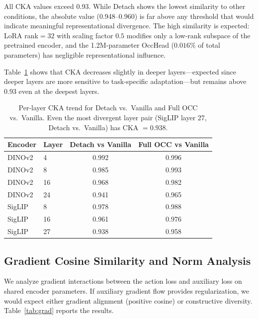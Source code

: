 \documentclass[10pt,letterpaper]{article}
\begin{document}
All CKA values exceed 0.93. While Detach shows the lowest similarity to other conditions, the absolute value (0.948--0.960) is far above any threshold that would indicate meaningful representational divergence. The high similarity is expected: LoRA rank$=32$ with scaling factor $0.5$ modifies only a low-rank subspace of the pretrained encoder, and the 1.2M-parameter OccHead ($0.016\%$ of total parameters) has negligible representational influence.

Table~\ref{tab:cka_layer} shows that CKA decreases slightly in deeper layers---expected since deeper layers are more sensitive to task-specific adaptation---but remains above 0.93 even at the deepest layers.

\begin{table}[h]
\centering
\caption{Per-layer CKA trend for Detach vs.\ Vanilla and Full OCC vs.\ Vanilla. Even the most divergent layer pair (SigLIP layer 27, Detach vs.\ Vanilla) has CKA $= 0.938$.}
\label{tab:cka_layer}
\begin{tabular}{llcc}
\toprule
\textbf{Encoder} & \textbf{Layer} & \textbf{Detach vs Vanilla} & \textbf{Full OCC vs Vanilla} \\
\midrule
DINOv2 & 4  & 0.992 & 0.996 \\
DINOv2 & 8  & 0.985 & 0.993 \\
DINOv2 & 16 & 0.968 & 0.982 \\
DINOv2 & 24 & 0.941 & 0.965 \\
SigLIP & 8  & 0.978 & 0.988 \\
SigLIP & 16 & 0.961 & 0.976 \\
SigLIP & 27 & 0.938 & 0.958 \\
\bottomrule
\end{tabular}
\end{table}

\subsection{Gradient Cosine Similarity and Norm Analysis}
\label{sec:gradient}

We analyze gradient interactions between the action loss and auxiliary loss on shared encoder parameters. If auxiliary gradient flow provides regularization, we would expect either gradient alignment (positive cosine) or constructive diversity. Table~\ref{tab:grad} reports the results.
\end{document}
